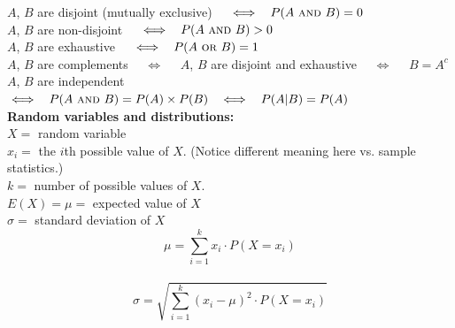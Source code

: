 \documentclass[12pt,letterpaper,addpoints,answers]{exam}
\begin{document}
\noindent
$A$, $B$ are disjoint (mutually exclusive) ~~$\iff~~P(A~\textsc{and}~ B) = 0$\\
$A$, $B$ are non-disjoint ~~$\iff~~P(A~\textsc{and}~ B) > 0$\\
$A$, $B$ are exhaustive ~~$\iff~~P(A~\textsc{or}~ B) = 1$\\
$A$, $B$ are complements ~~$\iff$~~ $A$, $B$ are disjoint and exhaustive ~~$\iff$~~ $B=A^c$\\
$A$, $B$ are independent ~~$\iff~~P(A~\textsc{and}~ B) = P(A)\times P(B) ~~\iff~~ P(A|B)=P(A)$\\

{\bf Random variables and distributions:}\\
$X=$ random variable \\
$x_i=$ the $i$th possible value of $X$. (Notice different meaning here {vs.} sample statistics.)\\
$k=$ number of possible values of $X$.\\
$E(X)=\mu=$ expected value of $X$\\
$\sigma=$ standard deviation of $X$
$$\mu = \sum\limits_{i=1}^k  x_i \cdot P(X=x_i) $$\\
$$\sigma = \sqrt{\sum\limits_{i=1}^k (x_i-\mu)^2 \cdot P(X=x_i)}$$
\end{document}
